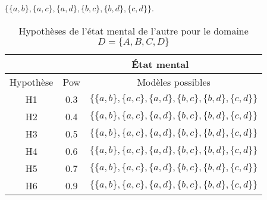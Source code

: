 \documentclass{llncs}
\begin{document}
	
%	


	
	$\{ \{a,b\}, \{a,c\}, \{a,d\}, \{b,c\}, \{b,d\}, \{c,d\} \}$.
	
			\begin{table}[h]
				\centering
				\begin{tabular}{ |c|c|c| }
					\hline
					 & \multicolumn{2}{c|}{État mental}  \\
					\hline
					Hypothèse & Pow & Modèles possibles \\
					\hline
					H1&0.3&$\{ \{a,b\}, \{a,c\}, \{a,d\}, \{b,c\}, \{b,d\}, \{c,d\} \}$ \\
					\hline
					H2&0.4&$\{ \{a,b\}, \{a,c\}, \{a,d\}, \{b,c\}, \{b,d\}, \{c,d\} \}$ \\
					\hline
					H3&0.5&$\{ \{a,b\}, \{a,c\}, \{a,d\}, \{b,c\}, \{b,d\}, \{c,d\} \}$\\
					\hline
					H4&0.6&$\{ \{a,b\}, \{a,c\}, \{a,d\}, \{b,c\}, \{b,d\}, \{c,d\} \}$ \\
					\hline
					H5&0.7&$\{ \{a,b\}, \{a,c\}, \{a,d\}, \{b,c\}, \{b,d\}, \{c,d\} \}$\\
				\hline
					H6&0.9&$\{ \{a,b\}, \{a,c\}, \{a,d\}, \{b,c\}, \{b,d\}, \{c,d\} \}$ \\
					\hline
				\end{tabular}
				\caption{Hypothèses de l'état mental de l'autre pour le domaine $D=\{A, B, C, D\}$}
				\label{table:poss}
			\end{table}
	
\end{document}
